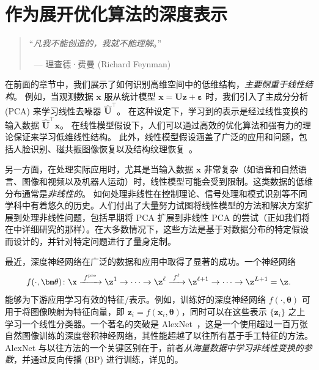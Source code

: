 \documentclass[../../book-main_zh.tex]{subfiles}
\begin{document}
\chapter{作为展开优化算法的深度表示}
\label{ch:deep-networks}

\begin{quote}
    \hfill    ``{\em 凡我不能创造的，我就不能理解}。''

    $~$ \hfill --- 理查德·费曼 (Richard Feynman)
\end{quote}
\vspace{5mm}

在前面的章节中，我们展示了如何识别高维空间中的低维结构，\textit{主要侧重于线性结构}。
例如，当观测数据 $\bm{x}$ 服从统计模型 $\bm{x} = \bm{U}\bm{z} + \bm{\varepsilon}$ 时，我们引入了主成分分析 (PCA) 来学习线性去噪器 $\hat{\bm{U}}^{\top}$。
在这种设定下，学习到的表示是经过线性变换的输入数据 $\hat{\bm{U}}^{\top}\bm{x}$。
在线性模型假设下，人们可以通过高效的优化算法和强有力的理论保证来学习低维线性结构。
此外，线性模型假设涵盖了广泛的应用和问题，包括人脸识别、磁共振图像恢复以及结构纹理恢复~\cite{Wright-Ma-2022}。

另一方面，在处理实际应用时，尤其是当输入数据 $\bm{x}$ 非常复杂（如语音和自然语言、图像和视频以及机器人运动）时，线性模型可能会受到限制。这类数据的低维分布通常是{\em 非线性的}。
如何处理非线性在控制理论、信号处理和模式识别等不同学科中有着悠久的历史。人们付出了大量努力试图将线性模型的方法和解决方案扩展到处理非线性问题，包括早期将 PCA 扩展到非线性 PCA 的尝试（正如我们将在中详细研究的那样）。在大多数情况下，这些方法是基于对数据分布的特定假设而设计的，并针对特定问题进行了量身定制。

最近，深度神经网络在广泛的数据和应用中取得了显著的成功。一个神经网络
\begin{equation}
    f(\cdot, \bm \theta) \colon \x
    \xrightarrow{\hspace{1mm} f^{\mathrm{pre}} \hspace{1mm}} \z^1
    \rightarrow \cdots
    \rightarrow \z^\ell \xrightarrow{\hspace{1mm} f^\ell \hspace{1mm}}
    \z^{\ell+1} \rightarrow  \cdots \to \z^{L+1} = \z.
\end{equation}
能够为下游应用学习有效的特征/表示。例如，训练好的深度神经网络 $f(\cdot, \bm \theta)$ 可用于将图像映射为特征向量，即 $\bm{z}_i = f(\bm{x}_i,\bm \theta)$，同时可以在这些表示 $\{\bm{z}_i\}$ 之上学习一个线性分类器。一个著名的突破是 AlexNet~\cite{krizhevsky2012imagenet}，这是一个使用超过一百万张自然图像训练的深度卷积神经网络，其性能超越了以往所有基于手工特征的方法。AlexNet 与以往方法的一个关键区别在于，前者\textit{从海量数据中学习非线性变换的参数}，并通过反向传播 (BP) \cite{Back-Prop} 进行训练，详见的。
\end{document}
